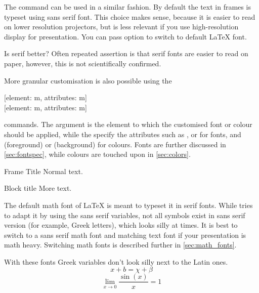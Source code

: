 The  command can be used in a similar fashion. By default the
text in frames is typeset using sans serif font. This choice makes sense,
because it is easier to read on lower resolution projectors, but is less
relevant if you use high-resolution display for presentation. You can pass
 option to switch to default \LaTeX{} font.
\begin{example}

\begin{frame}{Is serif better?}
  Often repeated assertion is
  that serif fonts are easier
  to read on paper, however, 
  this is not scientifically
  confirmed.
\end{frame}
\end{example}

More granular customisation is also possible using the
\begin{lscommand}
  [element: m, attributes: m] \\
  [element: m, attributes: m]
\end{lscommand}
commands. The  argument is the element to which the customised
font or colour should be applied, while the  specify the
attributes such as ,  or  for fonts, and
 (foreground) or  (background) for colours. Fonts are
further discussed in \autoref{sec:fontspec}, while colours are touched upon in
\autoref{sec:colors}.
\begin{example}

\begin{frame}{Frame Title}
  Normal text.
  \begin{block}{Block title}
    More text.
  \end{block}
\end{frame}
\end{example}

The default math font of \LaTeX{} is meant to typeset it in serif fonts. While
 tries to adapt it by using the sans serif variables, not all
symbols exist in sans serif version (for example, Greek letters), which looks
silly at times. It is best to switch to a sans serif math font and matching
text font if your presentation is math heavy. Switching math fonts is described
further in \autoref{sec:math_fonts}.
\begin{example}
\usepackage{unicode-math}
\setsansfont{Fira Sans}
\setoperatorfont{\mathsf}

\begin{frame} %
With these fonts Greek
variables don't look silly
next to the Latin ones.
\[ x + b = \chi + \beta \]
\[ \lim_{x \to 0}
   \frac{\sin(x)}{x} = 1 \]
\end{frame} %
\end{example}

